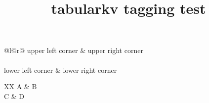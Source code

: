 \documentclass{article}
\title{tabularkv tagging test}
\begin{document}
\begin{tabularkv}[
width=4in,
height=1in,
valign=center
]{@{}l@{\extracolsep{\fill}}r@{}}
upper left corner & upper right corner\\
\noalign{\vfill}%
\\
\noalign{\vfill}%
lower left corner & lower right corner\\
\end{tabularkv}

\begin{tabularkv}[x=\linewidth]{XX}
A & B \\
C & D
\end{tabularkv}
\end{document}
